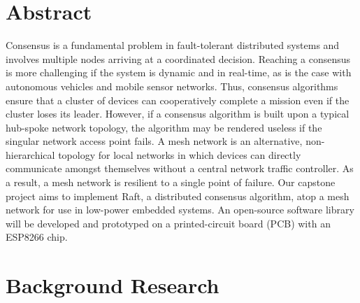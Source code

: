 \documentclass[compsoc]{IEEEtran}
\begin{document}


\section{Abstract}
\newcommand{\nextInternalParagraphStartsHere}{}

Consensus is a fundamental problem in fault-tolerant distributed systems and involves multiple nodes arriving at a coordinated decision. Reaching a consensus is more challenging if the system is dynamic and in real-time, as is the case with autonomous vehicles and mobile sensor networks. Thus, consensus algorithms ensure that a cluster of devices can cooperatively complete a mission even if the cluster loses its leader. However, if a consensus algorithm is built upon a typical hub-spoke network topology, the algorithm may be rendered useless if the singular network access point fails. \nextInternalParagraphStartsHere A mesh network is an alternative, non-hierarchical topology for local networks in which devices can directly communicate amongst themselves without a central network traffic controller. As a result, a mesh network is resilient to a single point of failure. \nextInternalParagraphStartsHere Our capstone project aims to implement Raft, a distributed consensus algorithm, atop a mesh network for use in low-power embedded systems. An open-source software library will be developed and prototyped on a printed-circuit board (PCB) with an ESP8266 chip. 


\newpage
\section{Background Research}
\end{document}
